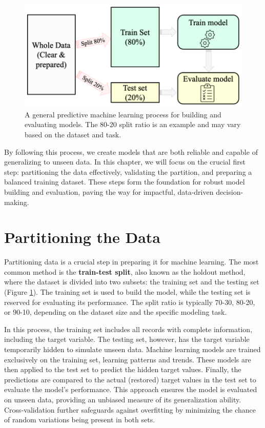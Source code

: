 \documentclass[
]{book}
\theoremstyle{definition}
\theoremstyle{definition}
\theoremstyle{definition}
\theoremstyle{definition}
\theoremstyle{remark}
\begin{document}
\begin{figure}

{\centering \includegraphics[width=0.8\linewidth]{images/partitioning} 

}

\caption{A general predictive machine learning process for building and evaluating models. The 80-20 split ratio is an example and may vary based on the dataset and task.}\label{fig:modeling}
\end{figure}

By following this process, we create models that are both reliable and capable of generalizing to unseen data. In this chapter, we will focus on the crucial first step: partitioning the data effectively, validating the partition, and preparing a balanced training dataset. These steps form the foundation for robust model building and evaluation, paving the way for impactful, data-driven decision-making.

\section{Partitioning the Data}\label{sec-partitioning}

Partitioning data is a crucial step in preparing it for machine learning. The most common method is the \textbf{train-test split}, also known as the holdout method, where the dataset is divided into two subsets: the training set and the testing set (Figure \ref{fig:modeling}). The training set is used to build the model, while the testing set is reserved for evaluating its performance. The split ratio is typically 70-30, 80-20, or 90-10, depending on the dataset size and the specific modeling task.

In this process, the training set includes all records with complete information, including the target variable. The testing set, however, has the target variable temporarily hidden to simulate unseen data. Machine learning models are trained exclusively on the training set, learning patterns and trends. These models are then applied to the test set to predict the hidden target values. Finally, the predictions are compared to the actual (restored) target values in the test set to evaluate the model's performance. This approach ensures the model is evaluated on unseen data, providing an unbiased measure of its generalization ability. Cross-validation further safeguards against overfitting by minimizing the chance of random variations being present in both sets.
\end{document}
